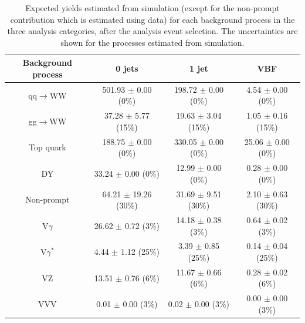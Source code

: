 \begin{table}[htb]
\begin{center}
\caption{Expected yields estimated from simulation (except for the non-prompt contribution which is estimated using data) for each background process in the three analysis categories, after the analysis event selection. The uncertainties are shown for the processes estimated from simulation.}\label{tab:bkg_yields}
\small{
\begin{tabular}{c c c c }
\toprule
             Background process           &         0 jets                                          &          1 jet                                         &        VBF                                           \\
\midrule
      qq$\to$WW                &    501.93 $\pm$       0.00 (0\%)              &     198.72 $\pm$       0.00 (0\%)             &      4.54 $\pm$       0.00 (0\%)               \\
      gg$\to$WW                &     37.28 $\pm$       5.77 (15\%)              &      19.63 $\pm$       3.04 (15\%)             &      1.05 $\pm$       0.16 (15\%)               \\
      Top quark                &    188.75 $\pm$       0.00 (0\%)              &     330.05 $\pm$       0.00 (0\%)             &     25.06 $\pm$       0.00 (0\%)               \\
      DY                &     33.24 $\pm$       0.00 (0\%)              &      12.99 $\pm$       0.00 (0\%)             &      0.28 $\pm$       0.00 (0\%)               \\
      Non-prompt                &     64.21 $\pm$      19.26 (30\%)              &      31.69 $\pm$       9.51 (30\%)             &      2.10 $\pm$       0.63 (30\%)               \\
      V$\gamma$                &     26.62 $\pm$       0.72  (3\%)              &      14.18 $\pm$       0.38  (3\%)             &      0.64 $\pm$       0.02 (3\%)               \\
     V$\gamma^*$                &      4.44 $\pm$       1.12 (25\%)              &       3.39 $\pm$       0.85 (25\%)             &      0.14 $\pm$       0.04 (25\%)               \\
     VZ                &     13.51 $\pm$       0.76  (6\%)              &      11.67 $\pm$       0.66 (6\%)             &      0.28 $\pm$       0.02 (6\%)               \\
     VVV                &      0.01 $\pm$       0.00 (3\%)              &       0.02 $\pm$       0.00 (3\%)             &      0.00 $\pm$       0.00 (3\%)               \\   
     

\end{tabular}}
\end{center}
\end{table}
